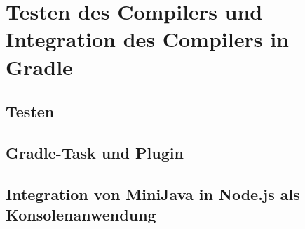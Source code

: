 \chapter{Testen des Compilers und Integration des Compilers in Gradle}

\section{Testen}

\section{Gradle-Task und Plugin}

\section{Integration von MiniJava in Node.js als Konsolenanwendung}
